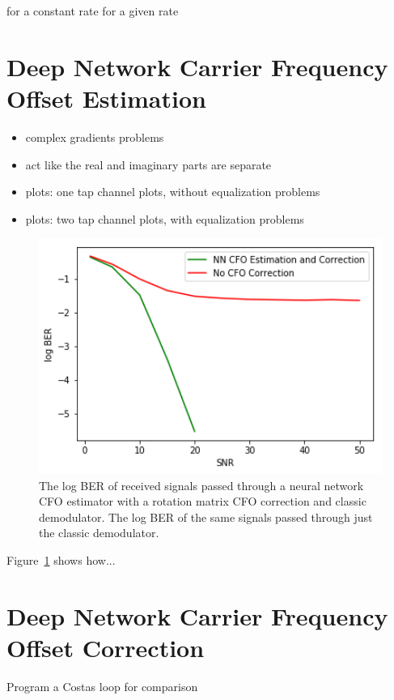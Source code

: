 for a constant rate
for a given rate


\section{Deep Network Carrier Frequency Offset Estimation}
\begin{itemize}
\item complex gradients problems
\item act like the real and imaginary parts are separate
\item plots: one tap channel plots, without equalization problems
\item plots: two tap channel plots, with equalization problems
\end{itemize}


\begin{figure}
\begin{center}
\includegraphics[width=14cm]{figures/cfo_estimation.png}
\caption{The log BER of received signals passed through a neural network CFO estimator with a rotation matrix CFO correction and classic demodulator. The log BER of the same signals passed through just the classic demodulator.}
\label{fig:cfo_est}
\end{center}
\end{figure}

Figure~\ref{fig:cfo_est} shows how...

\section{Deep Network Carrier Frequency Offset Correction}
Program a Costas loop for comparison 